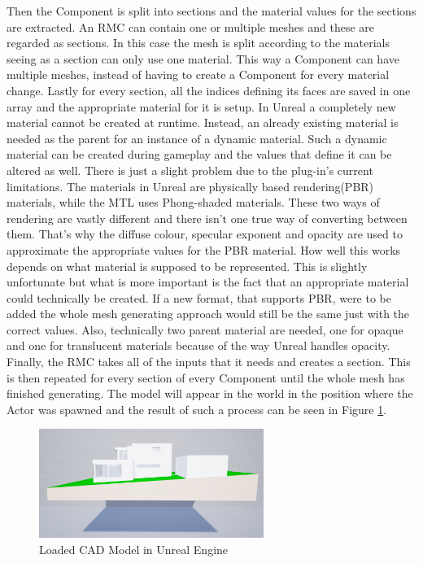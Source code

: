 Then the Component is split into sections and the material values for the sections are extracted. An \acs{RMC} can contain one or multiple meshes and these are regarded as sections. In this case the mesh is split according to the materials seeing as a section can only use one material. This way a Component can have multiple meshes, instead of having to create a Component for every material change. Lastly for every section, all the indices defining its faces are saved in one array and the appropriate material for it is setup. In Unreal a completely new material cannot be created at runtime. Instead, an already existing material is needed as the parent for an instance of a dynamic material. Such a dynamic material can be created during gameplay and the values that define it can be altered as well. There is just a slight problem due to the plug-in's current limitations. The materials in Unreal are physically based rendering(\acs{PBR}) materials\cite{bib:UEPBR}, while the MTL uses Phong-shaded materials\cite{bib:MTL}. These two ways of rendering are vastly different and there isn't one true way of converting between them. That's why the diffuse colour, specular exponent and opacity are used to approximate the appropriate values for the \acs{PBR} material. How well this works depends on what material is supposed to be represented. This is slightly unfortunate but what is more important is the fact that an appropriate material could technically be created. If a new format, that supports \acs{PBR}, were to be added the whole mesh generating approach would still be the same just with the correct values. Also, technically two parent material are needed, one for opaque and one for translucent materials because of the way Unreal handles opacity.\\
Finally, the \acs{RMC} takes all of the inputs that it needs and creates a section. This is then repeated for every section of every Component until the whole mesh has finished generating. The model will appear in the world in the position where the Actor was spawned and the result of such a process can be seen in Figure \ref{fig:LoadedModel}.

\begin{figure}[htpb]
	\centering
	\includegraphics[width=0.65\textwidth]{fig/LoadedModel2.png}
	\caption[Loaded CAD Model in Unreal Engine]{Loaded CAD Model in Unreal Engine\protect\footnotemark}
	\label{fig:LoadedModel}
\end{figure}


